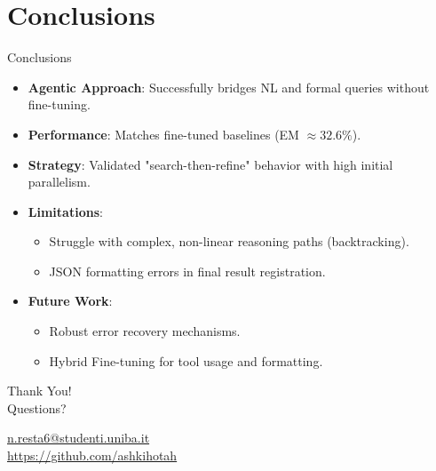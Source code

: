 \documentclass[aspectratio=169]{beamer}
\begin{document}
\section{Conclusions}

\begin{frame}{Conclusions}
  \begin{itemize}
    \item \textbf{Agentic Approach}: Successfully bridges NL and formal queries without fine-tuning.
    \item \textbf{Performance}: Matches fine-tuned baselines (EM $\approx 32.6\%$).
    \item \textbf{Strategy}: Validated "search-then-refine" behavior with high initial parallelism.
    \item \textbf{Limitations}:
      \begin{itemize}
        \item Struggle with complex, non-linear reasoning paths (backtracking).
        \item JSON formatting errors in final result registration.
      \end{itemize}
    \item \textbf{Future Work}:
      \begin{itemize}
        \item Robust error recovery mechanisms.
        \item Hybrid Fine-tuning for tool usage and formatting.
      \end{itemize}
  \end{itemize}
\end{frame}

\begin{frame}
  \centering
  \Huge Thank You! \\
  \vspace{1cm}
  \normalsize Questions?
  \vspace{0.5cm}
  
  \footnotesize
  \href{mailto:n.resta6@studenti.uniba.it}{n.resta6@studenti.uniba.it} \\
  \url{https://github.com/ashkihotah}
\end{frame}



\end{document}
